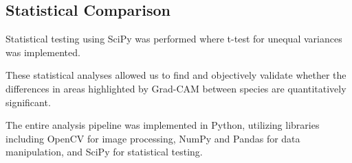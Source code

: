 \documentclass[a4paper,12pt]{report}
\begin{document}
\subsection{Statistical Comparison}
Statistical testing using SciPy was performed where t-test for unequal variances was implemented.






These statistical analyses allowed us to find and objectively validate whether the differences in areas highlighted by Grad-CAM between species are quantitatively significant.

The entire analysis pipeline was implemented in Python, utilizing libraries including OpenCV for image processing, NumPy and Pandas for data manipulation, and SciPy for statistical testing. 

\end{document}

